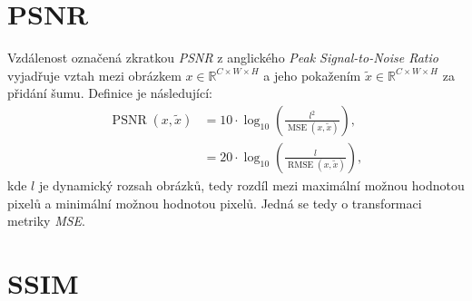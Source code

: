 \documentclass[czech]{article}
\begin{document}
\section{PSNR}

Vzdálenost označená zkratkou \emph{PSNR} z anglického \emph{Peak Signal-to-Noise Ratio}
vyjadřuje vztah mezi obrázkem $x \in \mathbb{R}^{C \times W \times H}$
a jeho pokažením $\tilde{x} \in \mathbb{R}^{C \times W \times H}$ za přidání šumu.
Definice je následující:
\begin{align}
    \operatorname{PSNR}(x, \tilde{x}) &= 10 \cdot \operatorname{log}_{10} \left( \frac{l^2}{\operatorname{MSE}(x, \tilde{x})} \right), \\
    &= 20 \cdot \operatorname{log}_{10} \left( \frac{l}{\operatorname{RMSE}(x, \tilde{x})} \right),
\end{align}
kde $l$ je dynamický rozsah obrázků, tedy rozdíl mezi maximální možnou hodnotou pixelů a minimální možnou hodnotou pixelů.
Jedná se tedy o transformaci metriky \emph{MSE}.

\section{SSIM}
\end{document}
